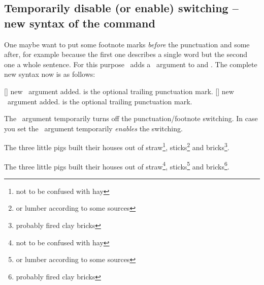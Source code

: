 \documentclass{fnpct-manual}
\begin{document}
\subsection{Temporarily disable (or enable) switching -- new syntax of the
   command}
One maybe want to put some footnote marks \emph{before} the punctuation and
some after, for example because the first one describes a single word but the
second one a whole sentence.  For this purpose \fnpct\ adds a \sarg\ argument
to  and .  The complete new syntax now is as
follows:
\begin{commands}
  [\sarg{}]
    new \sarg\ argument added.   is the optional trailing
    punctuation mark.
  [\sarg{}]
    new \sarg\ argument added.   is the optional trailing
    punctuation mark.
\end{commands}
The \sarg\ argument temporarily turns off the punctuation/footnote switching.
In case you set  the \sarg\ argument temporarily
\emph{enables} the switching.

\begin{example}
  \begin{minipage}{.4\linewidth}
    \noindent The three little pigs built their houses
    out of straw\footnote*{not to be confused with hay},
    sticks\footnote{or lumber according to some sources}
    and bricks\footnote{probably fired clay bricks}.
  \end{minipage}\hfil
  \begin{minipage}{.4\linewidth}
    \noindent The three little pigs built their houses
    out of straw\footnote*{not to be confused with hay},
    sticks\footnote{or lumber according to some sources}
    and bricks\footnote{probably fired clay bricks}.
  \end{minipage}
\end{example}
\end{document}
